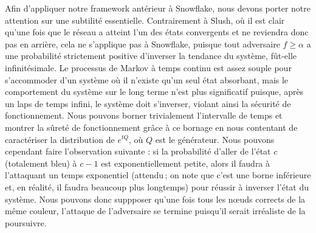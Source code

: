 \documentclass[letterpaper,twocolumn,10pt]{article}
\theoremstyle{definition}
\begin{document}
\begin{appendices}
Afin d'appliquer notre framework antérieur à Snowflake, nous devons porter notre attention sur une subtilité essentielle.
Contrairement à Slush, où il est clair qu'une fois que le réseau a atteint l'un des états convergents et ne reviendra donc pas en arrière, cela ne s'applique pas à Snowflake, puisque tout adversaire $f \geq \alpha$ a une probabilité strictement positive d'inverser la tendance du système, fût-elle infinitésimale.
Le processus de Markov à temps continu est assez souple pour s'accommoder d'un système où il n'existe qu'un seul état absorbant, mais le comportement du système sur le long terme n'est plus significatif puisque, après un laps de temps infini, le système doit s'inverser, violant ainsi la sécurité de fonctionnement.
Nous pouvons borner trivialement l'intervalle de temps et montrer la sûreté de fonctionnement grâce à ce bornage en nous contentant de caractériser la distribution de $e^{tQ}$, où $Q$ est le générateur.
Nous pouvons cependant faire l'observation suivante : si la probabilité d'aller de l'état $c$ (totalement bleu) à $c-1$ est exponentiellement petite, alors il faudra à l'attaquant un temps exponentiel (attendu\,; on note que c'est une borne inférieure et, en réalité, il faudra beaucoup plus longtemps) pour réussir à inverser l'état du système.
Nous pouvons donc suppposer qu'une fois tous les nœuds corrects de la même couleur, l'attaque de l'adversaire se termine puisqu'il serait irréaliste de la poursuivre.


\end{appendices}
\end{document}
